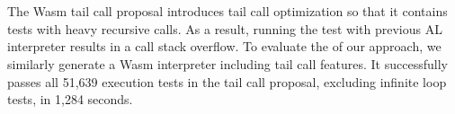 \section{}
The Wasm tail call proposal introduces tail call optimization so that it
contains tests with heavy recursive calls.
As a result, running the test with previous AL interpreter results in a call
stack overflow.
To evaluate the  of our approach, we similarly generate a Wasm
interpreter including tail call features.
It successfully passes all 51,639 execution tests in the tail call proposal,
excluding infinite loop tests, in 1,284 seconds.
